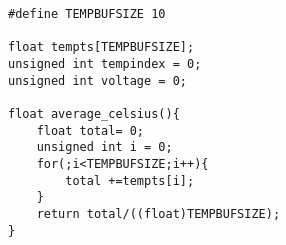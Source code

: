 \begin{code}
\label{code:sub-unit-temp-func}
\begin{verbatim}
#define TEMPBUFSIZE 10

float tempts[TEMPBUFSIZE];
unsigned int tempindex = 0;
unsigned int voltage = 0;

float average_celsius(){
    float total= 0;
    unsigned int i = 0;
    for(;i<TEMPBUFSIZE;i++){
        total +=tempts[i];
    }
    return total/((float)TEMPBUFSIZE);
}
\end{verbatim}
\end{code}